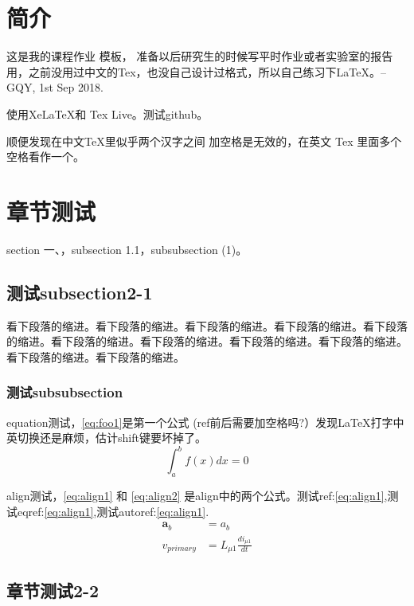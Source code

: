 \documentclass{myreport}
\begin{document}
\thispagestyle{empty}
\makemycover %




\clearpage
\newpage

\section{简介}
这是我的课程作业   模板，    准备以后研究生的时候写平时作业或者实验室的报告用，之前没用过中文的Tex，也没自己设计过格式，所以自己练习下\LaTeX。--GQY, 1st Sep 2018. 

使用XeLaTeX和 Tex Live。测试github。

顺便发现在中文TeX里似乎两个汉字之间   加空格是无效的，在英文 Tex 里面多个空格看作一个。


\section{章节测试}
section 一、，subsection 1.1，subsubsection (1)。
\subsection{测试subsection2-1}
看下段落的缩进。看下段落的缩进。看下段落的缩进。看下段落的缩进。看下段落的缩进。看下段落的缩进。看下段落的缩进。看下段落的缩进。看下段落的缩进。看下段落的缩进。看下段落的缩进。
\subsubsection{测试subsubsection}
equation测试，\eqref{eq:foo1}是第一个公式
{\color{red}(ref前后需要加空格吗?）}发现\LaTeX 打字中英切换还是麻烦，估计shift键要坏掉了。
\begin{equation}
\int_a^b f(x)dx = 0 \label{eq:foo1}
\end{equation}

align测试，\eqref{eq:align1} 和 \eqref{eq:align2} 是align中的两个公式。测试ref:\ref{eq:align1},测试eqref:\eqref{eq:align1},测试autoref:\autoref{eq:align1}.
\begin{align}
 \bm{a}_b &= a_b \label{eq:align1}\\
 v_{primary} &= L_{\mu 1}\frac{di_{\mu 1}}{dt} \label{eq:align2} 
\end{align}


\subsection{章节测试2-2}
\end{document}
